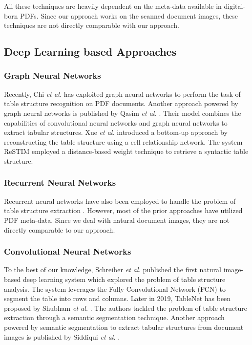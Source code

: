 \documentclass{ieeeaccess}
\begin{document}
All these techniques are heavily dependent on the meta-data available in digital-born PDFs. Since our approach works on the scanned document images, these techniques are not directly comparable with our approach.


\subsection{Deep Learning based Approaches}


\subsubsection{Graph Neural Networks}
Recently, Chi \textit{et al.} \cite{b23} has exploited graph neural networks \cite{b28} to perform the task of table structure recognition on PDF documents. Another approach powered by graph neural networks is published by Qasim \textit{et al.} \cite{b24}. Their model combines the capabilities of convolutional neural networks and graph neural networks to extract tabular structures. Xue \textit{et al.} introduced a bottom-up approach by reconstructing the table structure using a cell relationship network. The system ReSTIM \cite{b25} employed a distance-based weight technique to retrieve a syntactic table structure.


\subsubsection{Recurrent Neural Networks}

Recurrent neural networks \cite{b29} have also been employed to handle the problem of table structure extraction \cite{b30,b31}. However, most of the prior approaches have utilized PDF meta-data. Since we deal with natural document images, they are not directly comparable to our approach. 


\subsubsection{Convolutional Neural Networks}

To the best of our knowledge, Schreiber \textit{et al.} \cite{b27} published the first natural image-based deep learning system which explored the problem of table structure analysis. The system leverages the Fully Convolutional Network (FCN) \cite{b62} to segment the table into rows and columns. Later in 2019, TableNet has been proposed by Shubham \textit{et al.} \cite{b28}. The authors tackled the problem of table structure extraction through a semantic segmentation technique. Another approach powered by semantic segmentation to extract tabular structures from document images is published by Siddiqui \textit{et al.} \cite{b32}. 
\end{document}
